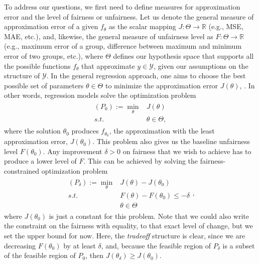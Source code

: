 \documentclass[11pt]{article}
\theoremstyle{plain}
\theoremstyle{definition}
\newcommand{\R}{\mathbb{R}}
\newcommand{\1}{\mathbf{1}}
\newcommand{\Y}{\mathcal{Y}}
\renewcommand{\R}{\mathbb{R}}
\begin{document}
To address our questions, we first need to define measures for approximation error and the level of fairness or unfairness. Let us denote the general measure of approximation error of a given $f_\theta$ as the scalar mapping $J:\Theta \rightarrow \R$ (e.g., MSE, MAE, etc.), and, likewise, the general measure of unfairness level as $F:\Theta \rightarrow \R$ (e.g., maximum error of a group, difference between maximum and minimum error of two groups, etc.), where $\Theta$ defines our hypothesis space that supports all the possible functions $f_\theta$ that approximate $y\in \Y$, given our assumptions on the structure of $\Y$. In the general regression approach, one aims to choose the best possible set of parameters $\theta \in \Theta$ to minimize the approximation error $J(\theta)$, . In other words, regression models solve the optimization problem
\begin{align}
    \label{opt:unconstrained_regression}
    \begin{array}{rc}
       \displaystyle (P_0):= \min_{\theta} & J(\theta) \\
        s.t. & \theta \in  \Theta,
    \end{array}
\end{align}
where the solution $\theta_0$ produces $f_{\theta_0}$, the approximation with the least approximation error, $J(\theta_0)$. This problem also gives us the baseline unfairness level $F(\theta_0)$. Any improvement $\delta>0$ on fairness that we wish to achieve has to produce a lower level of $F$. This can be achieved by solving the fairness-constrained optimization problem  
\begin{align}
\label{opt:fairness_constrained_regression}
    \begin{array}{rcr}
       \displaystyle (P_\delta):=  \min_{\theta} & J(\theta) - J(\theta_0) \\
        s.t. & F(\theta)-F(\theta_0) \leq -\delta\\
        & \theta \in  \Theta
    \end{array},
\end{align}
where $J(\theta_0)$ is just a constant for this problem. Note that we could also write the constraint on the fairness with equality, to that exact level of change, but we set the upper bound for now.  Here, the \textit{tradeoff} structure is clear, since we are decreasing $F(\theta_0)$ by at least $\delta$, and, because the feasible region of $P_\delta$ is a subset of the feasible region of $P_0$, then $J(\theta_\delta) \geq J(\theta_0)$.
\end{document}
